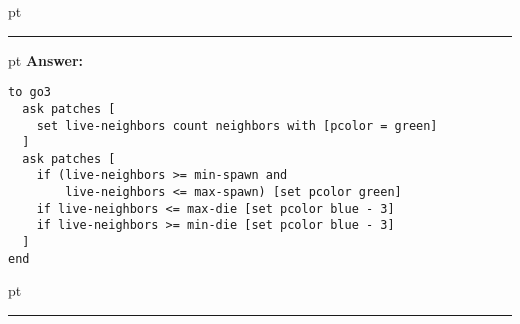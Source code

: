\documentclass[11pt]{book}
\begin{document}
\begin{enumerate}
\ifnum{}
 pt
\hrule
{} pt
{\bf Answer: }
\begin{verbatim}
to go3
  ask patches [
    set live-neighbors count neighbors with [pcolor = green]
  ]
  ask patches [
    if (live-neighbors >= min-spawn and 
        live-neighbors <= max-spawn) [set pcolor green]
    if live-neighbors <= max-die [set pcolor blue - 3]
    if live-neighbors >= min-die [set pcolor blue - 3]
  ]
end
\end{verbatim}
 pt
\hrule
\fi

\end{enumerate}

%


%
\end{document}

